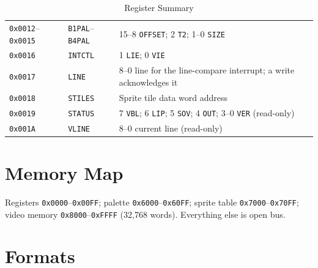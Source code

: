 \begin{table}[H]
\begin{tabular}{llp{7cm}}
		\texttt{0x0012}--\texttt{0x0015} & \texttt{B1PAL}--\texttt{B4PAL}     & 15--8 \texttt{OFFSET}; 2 \texttt{T2}; 1--0 \texttt{SIZE}                                                                                                               \\
		\texttt{0x0016}                  & \texttt{INTCTL}                    & 1 \texttt{LIE}; 0 \texttt{VIE}                                                                                                                                         \\
		\texttt{0x0017}                  & \texttt{LINE}                      & 8--0 line for the line-compare interrupt; a write acknowledges it                                                                                                      \\
		\texttt{0x0018}                  & \texttt{STILES}                    & Sprite tile data word address                                                                                                                                          \\
		\texttt{0x0019}                  & \texttt{STATUS}                    & 7 \texttt{VBL}; 6 \texttt{LIP}; 5 \texttt{SOV}; 4 \texttt{OUT}; 3--0 \texttt{VER} (read-only)                                                                          \\
		\texttt{0x001A}                  & \texttt{VLINE}                     & 8--0 current line (read-only)                                                                                                                                          \\
		\bottomrule
	\end{tabular}
	\caption{Register Summary}
	\label{tab:app-registers}
\end{table}

\section{Memory Map}

Registers \texttt{0x0000}--\texttt{0x00FF}; palette \texttt{0x6000}--\texttt{0x60FF}; sprite table
\texttt{0x7000}--\texttt{0x70FF}; video memory \texttt{0x8000}--\texttt{0xFFFF} (32,768 words). Everything else is open
bus.

\section{Formats}

